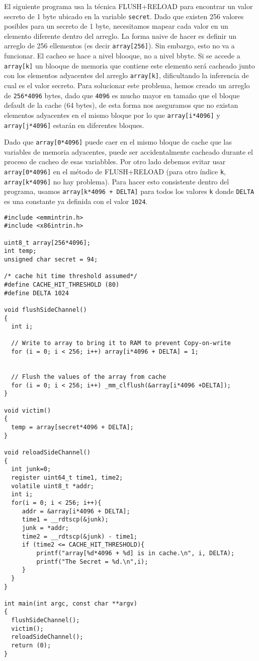 El siguiente programa usa la técnica FLUSH+RELOAD para encontrar un valor secreto de 1 byte ubicado en la variable \texttt{secret}. Dado que existen 256 valores posibles para un secreto de 1 byte, necesitamos mapear cada valor en un elemento diferente dentro del arreglo. La forma naive de hacer es definir un arreglo de 256 ellementos (es decir \texttt{array[256]}). Sin embargo, esto no va a funcionar. El cacheo se hace a nivel blooque, no a nivel bbyte. Si se accede a \texttt{array[k]} un blooque de memoria que contiene este elemento será cacheado junto con los elementos adyacentes del arreglo \texttt{array[k]}, dificultando la inferencia de cual es el valor secreto.
Para solucionar este problema, hemos creado un arreglo de \texttt{256*4096} bytes, dado que \texttt{4096} es mucho mayor en tamaño que el bloque default de la cache (64 bytes), de esta forma nos aseguramos que no existan elementos adyacentes en el mismo bloque por lo que \texttt{array[i*4096]} y \texttt{array[j*4096]} estarán en diferentes bloques.

Dado que  \texttt{array[0*4096]} puede caer en el mismo bloque de cache que las variables de memoria adyacentes, puede ser accidentalmente cacheado durante el proceso de cacheo de esas variabbles. Por otro lado debemos evitar usar  \texttt{array[0*4096]} en el método de FLUSH+RELOAD (para otro índice \texttt{k}, \texttt{array[k*4096]} no hay problema).
Para hacer esto consistente dentro del programa, usamos \texttt{array[k*4096 + DELTA]} para todos los valores \texttt{k} donde \texttt{DELTA} es una constante ya definida con el valor \texttt{1024}. 


\begin{lstlisting}[caption=\texttt{FlushReload.c}, label={sidechannel:list:flushreload}]
#include <emmintrin.h>
#include <x86intrin.h>

uint8_t array[256*4096];
int temp;
unsigned char secret = 94;

/* cache hit time threshold assumed*/
#define CACHE_HIT_THRESHOLD (80)
#define DELTA 1024

void flushSideChannel()
{
  int i;

  // Write to array to bring it to RAM to prevent Copy-on-write
  for (i = 0; i < 256; i++) array[i*4096 + DELTA] = 1;


  // Flush the values of the array from cache
  for (i = 0; i < 256; i++) _mm_clflush(&array[i*4096 +DELTA]);
}

void victim()
{
  temp = array[secret*4096 + DELTA];
}

void reloadSideChannel() 
{
  int junk=0;
  register uint64_t time1, time2;
  volatile uint8_t *addr;
  int i;
  for(i = 0; i < 256; i++){
     addr = &array[i*4096 + DELTA];
     time1 = __rdtscp(&junk);
     junk = *addr;
     time2 = __rdtscp(&junk) - time1;
     if (time2 <= CACHE_HIT_THRESHOLD){
         printf("array[%d*4096 + %d] is in cache.\n", i, DELTA);
         printf("The Secret = %d.\n",i);
     }
  }	
}

int main(int argc, const char **argv) 
{
  flushSideChannel();
  victim();
  reloadSideChannel();
  return (0);
}
\end{lstlisting}


